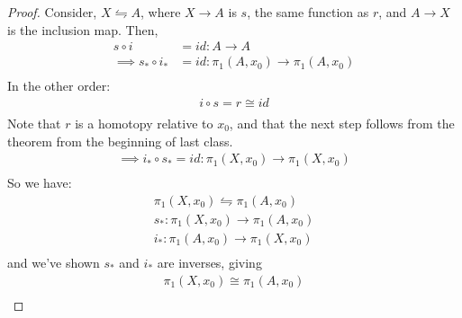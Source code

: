 \documentclass[../notes.tex]{subfiles}
\begin{document}
        \begin{proof}
            Consider, $X \leftrightharpoons A$, where
            $X\rightarrow A$ is $s$, the same function as $r$,
            and $A\rightarrow X$ is the inclusion map. Then,
            \begin{align*}
                s\circ i &= id: A\rightarrow A\\
                \implies s_* \circ i_* &= id: \pi_1(A,x_0)\rightarrow\pi_1(A,x_0)\\
            \end{align*}
            In the other order:
            \begin{align*}
                i\circ s = r\cong id\\
            \end{align*}
            Note that $r$ is a homotopy relative to $x_0$, and
            that the next step follows from the theorem from the beginning of
            last class.
            \begin{align*}
                \implies i_* \circ s_* = id: \pi_1(X,x_0)\rightarrow\pi_1(X,x_0)\\
            \end{align*}
            So we have:
            \begin{align*}
                \pi_1(X,x_0)\leftrightharpoons\pi_1(A,x_0)\\
                s_*:\pi_1(X,x_0)\rightarrow\pi_1(A,x_0)\\
                i_*:\pi_1(A,x_0)\rightarrow\pi_1(X,x_0)\\
            \end{align*}
            and we've shown $s_*$ and $i_*$ are inverses, giving
            \begin{align*}
                \pi_1(X,x_0)\cong\pi_1(A,x_0)\\
            \end{align*}
        \end{proof}
\end{document}

